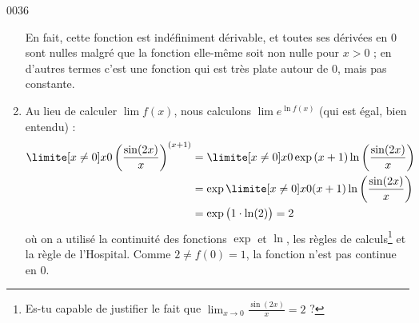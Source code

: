 \begin{corrige}{0036}
\begin{enumerate}
En fait, cette fonction est indéfiniment dérivable, et toutes ses dérivées en $0$ sont nulles malgré que la fonction elle-même soit non nulle pour $x > 0$ ; en d'autres termes c'est une fonction qui est très plate autour de $0$, mais pas constante.

\item
Au lieu de calculer $\lim f(x)$, nous calculons $\lim e^{\ln f(x) }$ (qui est égal, bien entendu) :
\begin{align*}
  \limite[x \neq 0] x 0 \left(\frac{\sin(2x)}{x}\right)^{(x+1)} &=
  \limite[x \neq 0] x 0 \exp{{(x+1)}
    \ln\left(\frac{\sin(2x)}{x}\right)}\\
  &= \exp{\limite[x \neq 0] x 0 {(x+1)}
    \ln\left(\frac{\sin(2x)}{x}\right)}\\
  &= \exp\big({1\cdot \ln(2)}\big) = 2
\end{align*}
où on a utilisé la continuité des fonctions $\exp{}$ et $\ln{}$, les règles de calculs\footnote{Es-tu capable de justifier le fait que $\lim_{x\to 0}\frac{ \sin(2x) }{ x }=2$ ?} et la règle de l'Hospital. Comme $2 \neq f(0) = 1$, la fonction n'est pas continue en $0$.


\end{enumerate}

\end{corrige}

